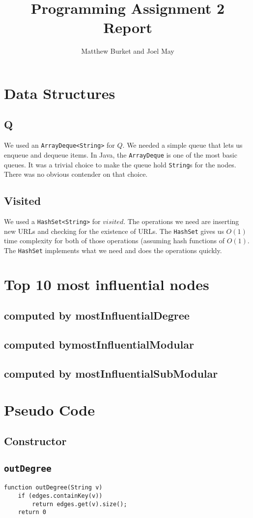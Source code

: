 \documentclass[10pt,letterpaper]{article}
\author{Matthew Burket and Joel May}
\title{Programming Assignment 2 Report}
\begin{document}
\maketitle

\section{Data Structures}
\subsection{Q}
We used an \texttt{ArrayDeque<String>} for $Q$. We needed a simple queue that lets us enqueue and dequeue items. In Java, the \texttt{ArrayDeque} is one of the most basic queues. It was a trivial choice to make the queue hold \texttt{String}s for the nodes. There was no obvious contender on that choice.
\subsection{Visited}
We used a \texttt{HashSet<String>} for $visited$. The operations we need are inserting new URLs and checking for the existence of URLs. The \texttt{HashSet} gives us $O(1)$ time complexity for both of those operations (assuming hash functions of $O(1)$. The \texttt{HashSet} implements what we need and does the operations quickly.
\section{Top 10 most influential nodes}
\subsection{computed by mostInfluentialDegree}
\subsection{computed bymostInfluentialModular}
\subsection{computed by mostInfluentialSubModular}
\section{Pseudo Code}
\subsection{Constructor}
\subsection{\texttt{outDegree}}
\begin{verbatim}
function outDegree(String v)
    if (edges.containKey(v))
        return edges.get(v).size();
	return 0
\end{verbatim}
\end{document}
